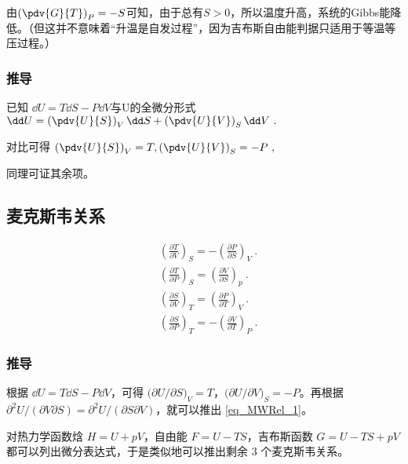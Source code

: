 由$\left(\pdv{G}{T}\right)_P=-S$可知，由于总有$S>0$，所以温度升高，系统的Gibbs能降低。（但这并不意味着“升温是自发过程”，因为吉布斯自由能判据只适用于等温等压过程。）

\subsubsection{推导}
已知 $\dd U = T \dd S - P \dd V$与U的全微分形式 $\dd U = \left(\pdv{U}{S}\right)_V \dd S+\left(\pdv{U}{V}\right)_S \dd V~.$

对比可得 $\left(\pdv{U}{S}\right)_V=T, \left(\pdv{U}{V}\right)_S=-P~,$

同理可证其余项。

\subsection{麦克斯韦关系}

\begin{align}
&\left(\frac{\partial T}{\partial V}\right)_S=-\left(\frac{\partial P}{\partial S}\right)_V\label{eq_MWRel_1}~.
\\
&\left(\frac{\partial T}{\partial P}\right)_S=\left(\frac{\partial V}{\partial S}\right)_p~.
\\
&\left(\frac{\partial S}{\partial V}\right)_T=\left(\frac{\partial P}{\partial T}\right)_V~.
\\
&\left(\frac{\partial S}{\partial P}\right)_T=-\left(\frac{\partial V}{\partial T}\right)_P~.
\end{align}

\subsubsection{推导}
根据 $\dd U=T\dd S-P\dd V$，可得 $\Big(\partial U/\partial S\Big)_V=T$，$\Big(\partial U/\partial V\Big)_S=-P$。再根据 $\partial^2 U/(\partial V\partial S)=\partial^2 U/(\partial S\partial V)$，就可以推出 \autoref{eq_MWRel_1}。

对热力学函数焓 $H=U+pV$，自由能 $F=U-TS$，吉布斯函数 $G=U-TS+pV$ 都可以列出微分表达式，于是类似地可以推出剩余 $3$ 个麦克斯韦关系。

